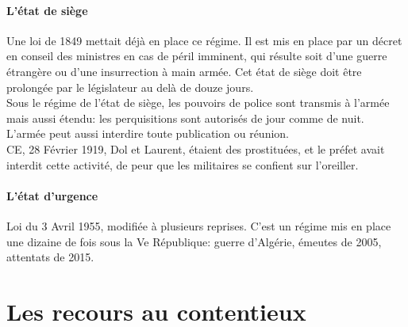 \documentclass[10pt, a4paper, openany]{book}
\begin{document}
\subsection{L'état de siège}

Une loi de 1849 mettait déjà en place ce régime. Il est mis en place par un décret en conseil des ministres en cas de péril imminent, qui résulte soit d'une guerre étrangère ou d'une insurrection à main armée. Cet état de siège doit être prolongée par le législateur au delà de douze jours. \\
Sous le régime de l'état de siège, les pouvoirs de police sont transmis à l'armée mais aussi étendu: les perquisitions sont autorisés de jour comme de nuit. L'armée peut aussi interdire toute publication ou réunion. \\
CE, 28 Février 1919, Dol et Laurent, étaient des prostituées, et le préfet avait interdit cette activité, de peur que les militaires se confient sur l'oreiller.

\subsection{L'état d'urgence}

Loi du 3 Avril 1955, modifiée à plusieurs reprises. C'est un régime mis en place une dizaine de fois sous la Ve République: guerre d'Algérie, émeutes de 2005, attentats de 2015. \\









\part{Les recours au contentieux}
\end{document}
